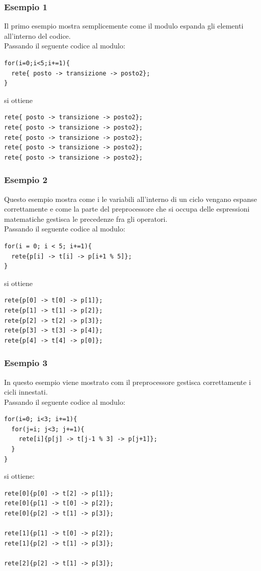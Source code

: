 \documentclass[italian,12pt]{book}
\begin{document}
\subsubsection{Esempio 1}
Il primo esempio mostra semplicemente come il modulo espanda gli
elementi all'interno del codice. \\
Passando il seguente codice al modulo:
\begin{verbatim}
for(i=0;i<5;i+=1){
  rete{ posto -> transizione -> posto2};
}
\end{verbatim}
si ottiene
\begin{verbatim}
rete{ posto -> transizione -> posto2};
rete{ posto -> transizione -> posto2};
rete{ posto -> transizione -> posto2};
rete{ posto -> transizione -> posto2};
rete{ posto -> transizione -> posto2};
\end{verbatim}

\subsubsection{Esempio 2}
Questo esempio mostra come i le variabili all'interno di un ciclo
vengano espanse correttamente e come la parte del preprocessore che si
occupa delle espressioni matematiche gestisca le precedenze fra gli
operatori.\\
Passando il seguente codice al modulo:
\begin{verbatim}
for(i = 0; i < 5; i+=1){
  rete{p[i] -> t[i] -> p[i+1 % 5]};
}
\end{verbatim}
si ottiene
\begin{verbatim}
rete{p[0] -> t[0] -> p[1]};
rete{p[1] -> t[1] -> p[2]};
rete{p[2] -> t[2] -> p[3]};
rete{p[3] -> t[3] -> p[4]};
rete{p[4] -> t[4] -> p[0]};
\end{verbatim}

\subsubsection{Esempio 3}
In questo esempio viene mostrato com il preprocessore gestisca
correttamente i cicli innestati. \\
Passando il seguente codice al modulo:
\begin{verbatim}
for(i=0; i<3; i+=1){
  for(j=i; j<3; j+=1){
    rete[i]{p[j] -> t[j-1 % 3] -> p[j+1]};
  }
}
\end{verbatim}
si ottiene:
\begin{verbatim}
rete[0]{p[0] -> t[2] -> p[1]};
rete[0]{p[1] -> t[0] -> p[2]};
rete[0]{p[2] -> t[1] -> p[3]};
    
rete[1]{p[1] -> t[0] -> p[2]};
rete[1]{p[2] -> t[1] -> p[3]};
    
rete[2]{p[2] -> t[1] -> p[3]};
\end{verbatim}
\end{document}
